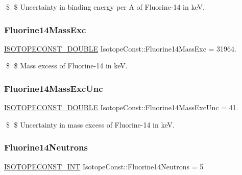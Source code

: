 \$ \$ Uncertainty in binding energy per A of Fluorine-\/14 in keV. \mbox{\label{group___isotope_const-_fluorine-_f14_gafd85fd4081362929e3cdc02a0ba9af89}} 
\subsubsection{\texorpdfstring{Fluorine14\+Mass\+Exc}{Fluorine14MassExc}}
{\footnotesize\ttfamily \mbox{\hyperlink{group___isotope_const-_macros_ga8f45a7272ce02c0b4c65c44636ed719a}{I\+S\+O\+T\+O\+P\+E\+C\+O\+N\+S\+T\+\_\+\+D\+O\+U\+B\+LE}} Isotope\+Const\+::\+Fluorine14\+Mass\+Exc = 31964.}

\$ \$ Mass excess of Fluorine-\/14 in keV. \mbox{\label{group___isotope_const-_fluorine-_f14_ga6ea15874c971b763a439c10c25819f3d}} 
\subsubsection{\texorpdfstring{Fluorine14\+Mass\+Exc\+Unc}{Fluorine14MassExcUnc}}
{\footnotesize\ttfamily \mbox{\hyperlink{group___isotope_const-_macros_ga8f45a7272ce02c0b4c65c44636ed719a}{I\+S\+O\+T\+O\+P\+E\+C\+O\+N\+S\+T\+\_\+\+D\+O\+U\+B\+LE}} Isotope\+Const\+::\+Fluorine14\+Mass\+Exc\+Unc = 41.}

\$ \$ Uncertainty in mass excess of Fluorine-\/14 in keV. \mbox{\label{group___isotope_const-_fluorine-_f14_ga8ca1ac7c2ecf44a219c393490b6cd1d0}} 
\subsubsection{\texorpdfstring{Fluorine14\+Neutrons}{Fluorine14Neutrons}}
{\footnotesize\ttfamily \mbox{\hyperlink{group___isotope_const-_macros_ga5f18360b3e99483a35c32d789e62621c}{I\+S\+O\+T\+O\+P\+E\+C\+O\+N\+S\+T\+\_\+\+I\+NT}} Isotope\+Const\+::\+Fluorine14\+Neutrons = 5}

